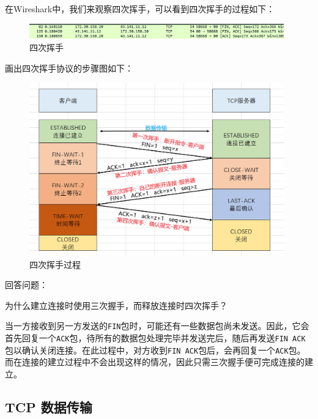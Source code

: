\documentclass{article}
\begin{document}
	在Wireshark中，我们来观察四次挥手，可以看到四次挥手的过程如下：
	
	\begin{figure}[H]
		\centering
		\includegraphics[width=11cm]{images/20.四次挥手.png}
		\caption{四次挥手}
	\end{figure}
	
	画出四次挥手协议的步骤图如下：
	
	\begin{figure}[H]
		\centering
		\includegraphics[width=11cm]{images/21.四次挥手过程.png}
		\caption{四次挥手过程}
	\end{figure}
	
	回答问题：
	
	\begin{tcolorbox}[title = {Question}, colback = red!25!white, colframe = red!75!black]
		为什么建立连接时使用三次握手，而释放连接时四次挥手？
	\end{tcolorbox}
	
	\begin{tcolorbox}[title = {Answer}, colback = blue!25!white, colframe = blue!75!black]
		当一方接收到另一方发送的\texttt{FIN}包时，可能还有一些数据包尚未发送。因此，它会首先回复一个\texttt{ACK}包，待所有的数据包处理完毕并发送完后，随后再发送\texttt{FIN ACK}包以确认关闭连接。在此过程中，对方收到\texttt{FIN ACK}包后，会再回复一个\texttt{ACK}包。而在连接的建立过程中不会出现这样的情况，因此只需三次握手便可完成连接的建立。
	\end{tcolorbox}
	
	\subsection{TCP 数据传输}
	
\end{document}
